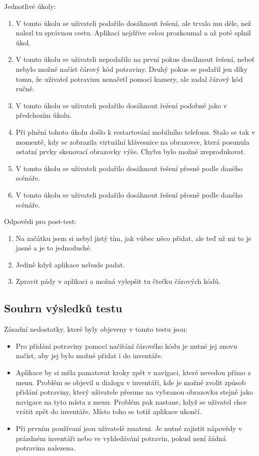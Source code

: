 \documentclass[thesis=B,czech]{FITthesis}[2013/10/20]
\begin{document}
Jednotlivé úkoly:
\begin{enumerate}
  \item V tomto úkolu se uživateli podařilo dosáhnout řešení, ale trvalo mu déle, než nalezl tu správnou cestu. Aplikaci nejdříve celou prozkoumal a až poté splnil úkol.
  \item V tomto úkolu se uživateli nepodařilo na první pokus dosáhnout řešení, neboť nebylo možné načíst čárový kód potraviny. Druhý pokus se podařil jen díky tomu, že uživatel potravinu nenačetl pomocí kamery, ale zadal čárový kód ručně.
  \item V tomto úkolu se uživateli podařilo dosáhnout řešení podobně jako v předchozím úkolu.
  \item Při plnění tohoto úkolu došlo k restartování mobilního telefonu. Stalo se tak v momentě, kdy se zobrazila virtuální klávesnice na obrazovce, která posunula ostatní prvky skenovací obrazovky výše. Chybu bylo možné zreprodukovat.
  \item V tomto úkolu se uživateli podařilo dosáhnout řešení přesně podle daného scénáře.
  \item V tomto úkolu se uživateli podařilo dosáhnout řešení přesně podle daného scénáře.
\end{enumerate}


Odpovědi pro post-test:
\begin{enumerate}
  \item Na začátku jsem si nebyl jistý tím, jak vůbec něco přidat, ale teď už mi to je jasné a je to jednoduché.
  \item Jedině když aplikace nebude padat.
  \item Zpravit pády v aplikaci a možná vylepšit tu čtečku čárových kódů.
\end{enumerate}

\subsection{Souhrn výsledků testu}

Zásadní nedostatky, které byly objeveny v tomto testu jsou:
\begin{itemize}
	\item{Pro přidání potraviny pomocí načítání čárového kódu je nutné jej znovu načíst, aby jej bylo možné přidat i do inventáře.}
	\item{Aplikace by si měla pamatovat kroky zpět v navigaci, které nevedou přímo z menu. Problém se objevil u dialogu v inventáři, kde je možné zvolit způsob přidání potraviny, který uživatele přesune na vybranou obrazovku stejně jako navigace na tyto místa z menu. Problém pak nastane, když se uživatel chce vrátit zpět do inventáře. Místo toho se totiž aplikace ukončí.}
	\item{Při prvním používaní jsou uživatelé zmateni. Je nutné zajistit nápovědy v prázdném inventáři nebo ve vyhledávání potravin, pokud není žádná potravina nalezena.}
\end{itemize}
\end{document}
